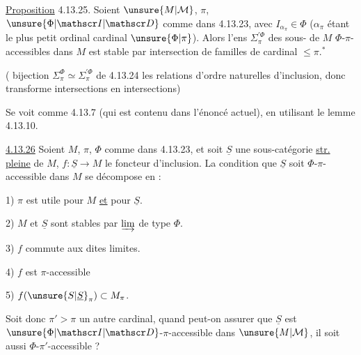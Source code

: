 

\uline{Proposition} 4.13.25. Soient $\unsure{M|\mathcal M}$, $\pi$, $\unsure{\Phi|\mathscr I|\mathscr D}$ comme dans 4.13.23, avec $I_{\alpha_\pi}\in\Phi$ ($\alpha_\pi$ étant le plus petit ordinal  cardinal $\unsure{\Phi|\pi}$). Alors l'ens $\Sigma_\pi^{\prime\Phi}$ des sous- de $M$ $\Phi$-$\pi$-accessibles dans $M$ est stable par intersection de familles de cardinal $\leq\pi$.$^{*}$


 (  bijection $\Sigma_\pi^\Phi\simeq\Sigma_\pi^{\prime\Phi}$ de 4.13.24  les relations d'ordre naturelles d'inclusion, donc transforme intersections en intersections)

Se voit comme 4.13.7 (qui est contenu dans l'énoncé actuel), en utilisant le lemme 4.13.10.

\uline{4.13.26} Soient $M$, $\pi$, $\Phi$ comme dans 4.13.23, et soit $\underline S$ une sous-catégorie \uline{str. pleine} de $M$, $f:\underline S\to M$ le foncteur d'inclusion.  La condition que $\underline S$ soit $\Phi$-$\pi$-accessible dans $M$ se décompose en :

1) $\pi$ est utile pour $M$ \uline{et} pour $\underline S$.

2) $M$ et $\underline S$ sont stables par $\varinjlim$ de type $\Phi$.

3) $f$ commute aux dites limites.

4) $f$ est $\pi$-accessible

5) $f(\unsure{S|\underline S}_\pi)\subset M_\pi$.



Soit donc $\pi'>\pi$ un autre cardinal, quand peut-on assurer que  $\underline S$ est $\unsure{\Phi|\mathscr I|\mathscr D}$-$\pi$-accessible dans $\unsure{M|\mathcal M}$, il soit aussi $\Phi$-$\pi'$-accessible ?

